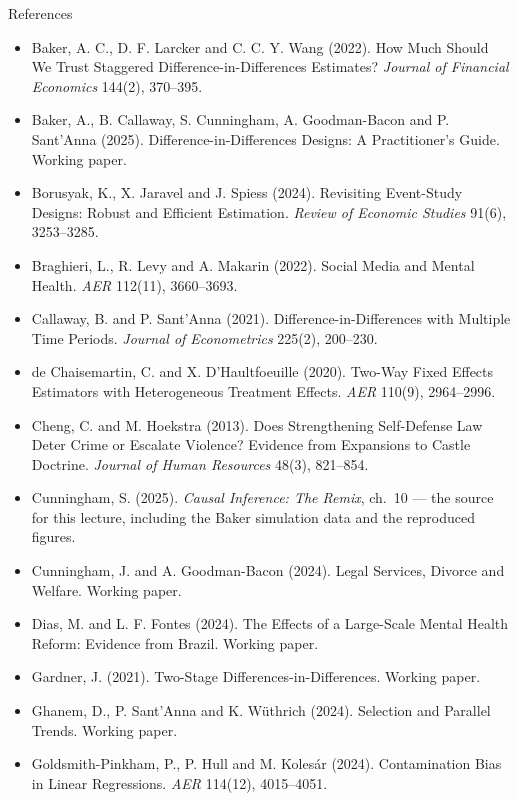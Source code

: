 \documentclass[
  11pt,
  ignorenonframetext,
  aspectratio=169,
]{beamer}
\providecommand{\tightlist}{%
  \setlength{\itemsep}{0pt}\setlength{\parskip}{0pt}}
\begin{document}
\begin{frame}{References}
\protect{}\label{references}
\tiny

\begin{itemize}
\tightlist
\item
  Baker, A. C., D. F. Larcker and C. C. Y. Wang (2022). How Much Should
  We Trust Staggered Difference-in-Differences Estimates? \emph{Journal
  of Financial Economics} 144(2), 370--395.
\item
  Baker, A., B. Callaway, S. Cunningham, A. Goodman-Bacon and P.
  Sant'Anna (2025). Difference-in-Differences Designs: A Practitioner's
  Guide. Working paper.
\item
  Borusyak, K., X. Jaravel and J. Spiess (2024). Revisiting Event-Study
  Designs: Robust and Efficient Estimation. \emph{Review of Economic
  Studies} 91(6), 3253--3285.
\item
  Braghieri, L., R. Levy and A. Makarin (2022). Social Media and Mental
  Health. \emph{AER} 112(11), 3660--3693.
\item
  Callaway, B. and P. Sant'Anna (2021). Difference-in-Differences with
  Multiple Time Periods. \emph{Journal of Econometrics} 225(2),
  200--230.
\item
  de Chaisemartin, C. and X. D'Haultfoeuille (2020). Two-Way Fixed
  Effects Estimators with Heterogeneous Treatment Effects. \emph{AER}
  110(9), 2964--2996.
\item
  Cheng, C. and M. Hoekstra (2013). Does Strengthening Self-Defense Law
  Deter Crime or Escalate Violence? Evidence from Expansions to Castle
  Doctrine. \emph{Journal of Human Resources} 48(3), 821--854.
\item
  Cunningham, S. (2025). \emph{Causal Inference: The Remix}, ch.~10 ---
  the source for this lecture, including the Baker simulation data and
  the reproduced figures.
\item
  Cunningham, J. and A. Goodman-Bacon (2024). Legal Services, Divorce
  and Welfare. Working paper.
\item
  Dias, M. and L. F. Fontes (2024). The Effects of a Large-Scale Mental
  Health Reform: Evidence from Brazil. Working paper.
\item
  Gardner, J. (2021). Two-Stage Differences-in-Differences. Working
  paper.
\item
  Ghanem, D., P. Sant'Anna and K. Wüthrich (2024). Selection and
  Parallel Trends. Working paper.
\item
  Goldsmith-Pinkham, P., P. Hull and M. Kolesár (2024). Contamination
  Bias in Linear Regressions. \emph{AER} 114(12), 4015--4051.
\end{itemize}
\end{frame}
\end{document}
